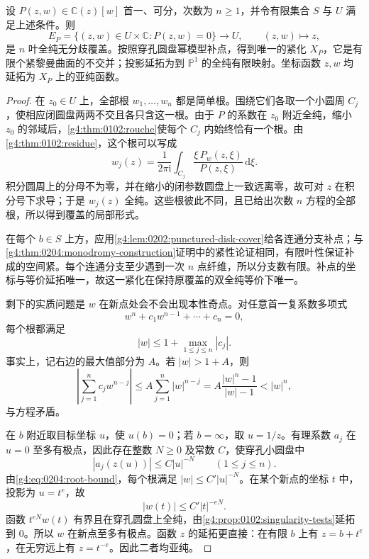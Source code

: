 \begin{proposition}\label{g4:prop:0204:root-cover}
	设 \(P(z,w)\in\mathbb C(z)[w]\) 首一、可分，次数为 \(n\ge1\)，并令有限集合 \(S\) 与 \(U\) 满足上述条件。则
	\[
		E_P=\{(z,w)\in U\times\mathbb C:P(z,w)=0\}
		\longrightarrow U,\qquad (z,w)\longmapsto z,
	\]
	是 \(n\) 叶全纯无分歧覆盖。按照穿孔圆盘幂模型补点，得到唯一的紧化 \(X_P\)，它是有限个紧黎曼曲面的不交并；投影延拓为到 \(\mathbb P^1\) 的全纯有限映射。坐标函数 \(z,w\) 均延拓为 \(X_P\) 上的亚纯函数。
\end{proposition}
\begin{proof}
	在 \(z_0\in U\) 上，全部根 \(w_1,\ldots,w_n\) 都是简单根。围绕它们各取一个小圆周 \(C_j\)，使相应闭圆盘两两不交且各只含这一根。由于 \(P\) 的系数在 \(z_0\) 附近全纯，缩小 \(z_0\) 的邻域后，\cref{g4:thm:0102:rouche}使每个 \(C_j\) 内始终恰有一个根。由\cref{g4:thm:0102:residue}，这个根可以写成
	\[
		w_j(z)=\frac1{2\pi\mathrm{i}}\int_{C_j}
		\frac{\xi\,P_w(z,\xi)}{P(z,\xi)}\,\mathrm{d}\xi.
	\]
	积分圆周上的分母不为零，并在缩小的闭参数圆盘上一致远离零，故可对 \(z\) 在积分号下求导；于是 \(w_j(z)\) 全纯。这些根彼此不同，且已给出次数 \(n\) 方程的全部根，所以得到覆盖的局部形式。

	在每个 \(b\in S\) 上方，应用\cref{g4:lem:0202:punctured-disk-cover}给各连通分支补点；与\cref{g4:thm:0204:monodromy-construction}证明中的紧性论证相同，有限叶性保证补成的空间紧。每个连通分支至少遇到一次 \(n\) 点纤维，所以分支数有限。补点的坐标与等价延拓唯一，故这一紧化在保持原覆盖的双全纯等价下唯一。

	剩下的实质问题是 \(w\) 在新点处会不会出现本性奇点。对任意首一复系数多项式
	\[
		w^n+c_1w^{n-1}+\cdots+c_n=0,
	\]
	每个根都满足
	\begin{equation}\label{g4:eq:0204:root-bound}
		|w|\le1+\max_{1\le j\le n}|c_j|.
	\end{equation}
	事实上，记右边的最大值部分为 \(A\)。若 \(|w|>1+A\)，则
	\[
		\left|\sum_{j=1}^n c_jw^{n-j}\right|
		\le A\sum_{j=1}^n|w|^{n-j}
		=A\frac{|w|^n-1}{|w|-1}<|w|^n,
	\]
	与方程矛盾。

	在 \(b\) 附近取目标坐标 \(u\)，使 \(u(b)=0\)；若 \(b=\infty\)，取 \(u=1/z\)。有理系数 \(a_j\) 在 \(u=0\) 至多有极点，因此存在整数 \(N\ge0\) 及常数 \(C\)，使穿孔小圆盘中
	\[
		|a_j(z(u))|\le C|u|^{-N}\qquad(1\le j\le n).
	\]
	由\eqref{g4:eq:0204:root-bound}，每个根满足 \(|w|\le C'|u|^{-N}\)。在某个新点的坐标 \(t\) 中，投影为 \(u=t^e\)，故
	\[
		|w(t)|\le C'|t|^{-eN}.
	\]
	函数 \(t^{eN}w(t)\) 有界且在穿孔圆盘上全纯，由\cref{g4:prop:0102:singularity-tests}延拓到 \(0\)。所以 \(w\) 在新点至多有极点。函数 \(z\) 的延拓更直接：在有限 \(b\) 上有 \(z=b+t^e\)，在无穷远上有 \(z=t^{-e}\)。因此二者均亚纯。
\end{proof}

